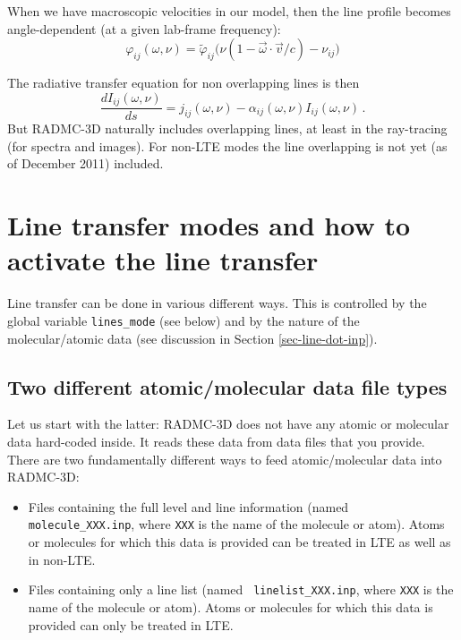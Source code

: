 \documentclass{report}
\begin{document}
When we have macroscopic velocities in our model, then the line profile
becomes angle-dependent (at a given lab-frame frequency):
\begin{equation}
\varphi_{ij}(\omega,\nu) = \tilde\varphi_{ij}\big(\nu(1-\vec\omega\cdot \vec v/c)-\nu_{ij}\big)
\end{equation}

The radiative transfer equation for non overlapping lines is then
\begin{equation}\label{eq-molec-rad-trans-eq}
\frac{dI_{ij}(\omega,\nu)}{ds} = j_{ij}(\omega,\nu) - 
\alpha_{ij}(\omega,\nu) I_{ij}(\omega,\nu)\,.
\end{equation}
But RADMC-3D naturally includes overlapping lines, at least in the 
ray-tracing (for spectra and images). For non-LTE modes the line
overlapping is not yet (as of December 2011) included.


\section{Line transfer modes and how to activate the line transfer}
\label{sec-line-trans-modes}
%
Line transfer can be done in various different ways. This is controlled by
the global variable {\small\tt lines\_mode} (see below) and by the nature of
the molecular/atomic data (see discussion in Section
\ref{sec-line-dot-inp}).

\subsection{Two different atomic/molecular data file types}
Let us start with the latter: RADMC-3D does not have any atomic or molecular
data hard-coded inside. It reads these data from data files that you provide.
There are two fundamentally different ways to feed atomic/molecular data into
RADMC-3D:
\begin{itemize}
\item Files containing the full level and line information (named {\small\tt
    molecule\_XXX.inp}, where {\small\tt XXX} is the name of the molecule or
  atom). Atoms or molecules for which this data is provided can be treated
  in LTE as well as in non-LTE.
\item Files containing only a line list (named {\small\tt
    linelist\_XXX.inp}, where {\small\tt XXX} is the name of the molecule or
  atom). Atoms or molecules for which this data is provided can only be
  treated in LTE.
\end{itemize}
\end{document}
